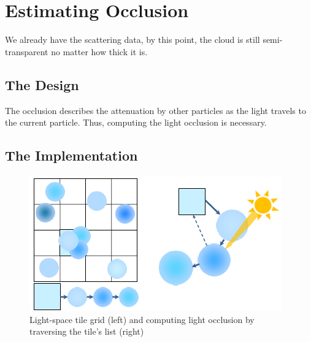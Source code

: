 \section{Estimating Occlusion}
We already have the scattering data, by this point, the cloud is still semi-transparent no matter how thick it is. 
\subsection{The Design}
The occlusion describes the attenuation by other particles as the light travels to the current particle. Thus, computing the light occlusion is necessary.

\subsection{The Implementation}
\begin{figure}[htp]
\begin{center}
\includegraphics[scale=0.7]{images/occlusion.png}
\caption{Light-space tile grid (left) and computing light occlusion
by traversing the tile’s list (right)}
\label{f14}
\end{center}
\end{figure}

